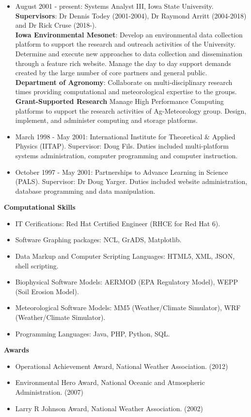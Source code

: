 \begin{itemize}
\item August 2001 - present: Systems Analyst III, Iowa State University.\\
 \textbf{Supervisors}: Dr Dennis Todey (2001-2004), Dr Raymond Arritt (2004-2018) and Dr Rick Cruse (2018-).  \\
\textbf{Iowa Environmental Mesonet}: Develop an environmental data collection
platform to support the research and outreach activities of the University.
Determine and execute new approaches to data collection and dissemination 
through a feature rich website.  Manage the day to day support demands 
created by the large number of core partners and general public. \\
\textbf{Department of Agronomy}: Collaborate on multi-disciplinary research
times providing computational and meteorological expertise to the groups. \\
\textbf{Grant-Supported Research} Manage High Performance Computing platforms
to support the research activities of Ag-Meteorology group.  Design, 
implement, and administer computing and storage platforms.
\item March 1998 - May 2001: International Institute for Theoretical \& Applied 
Physics (IITAP).  Supervisor: Doug Fils. Duties included multi-platform 
systems administration, computer programming and computer instruction.
\item October 1997 - May 2001: Partnerships to Advance Learning in Science
(PALS).  Supervisor: Dr Doug Yarger.  Duties included website administration,
database programming and data manipulation.
\end{itemize}
%
\Large \bf Computational Skills
\normalsize \sf
\begin{itemize}
\item IT Cerifications: Red Hat Certified Engineer (RHCE for Red Hat 6).
\item Software Graphing packages: NCL, GrADS, Matplotlib.
\item Data Markup and Computer Scripting Languages: HTML5, XML, JSON, shell scripting.
\item Biophysical Software Models: AERMOD (EPA Regulatory Model), WEPP (Soil Erosion Model).
\item Meteorological Software Models: MM5 (Weather/Climate Simulator), WRF (Weather/Climate Simulator).
\item Programming Languages: Java, PHP, Python, SQL.
\end{itemize} 
%
\normalsize \sf
\Large \bf Awards
\normalsize \sf
\begin{itemize}
\item Operational Achievement Award, National Weather Association. (2012)
\item Environmental Hero Award, National Oceanic and Atmospheric Administration. (2007)
\item Larry R Johnson Award, National Weather Association. (2002)
\end{itemize}



